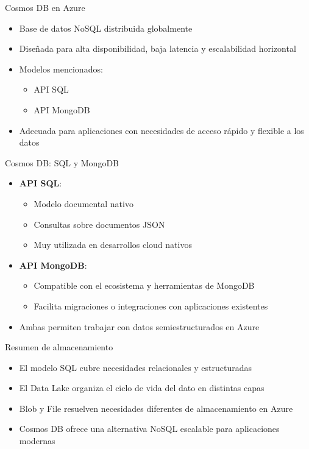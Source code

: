 \documentclass{beamer}
\begin{document}
\begin{frame}{Cosmos DB en Azure}
\begin{itemize}
    \item Base de datos NoSQL distribuida globalmente
    \item Diseñada para alta disponibilidad, baja latencia y escalabilidad horizontal
    \item Modelos mencionados:
    \begin{itemize}
        \item API SQL
        \item API MongoDB
    \end{itemize}
    \item Adecuada para aplicaciones con necesidades de acceso rápido y flexible a los datos
\end{itemize}
\end{frame}

\begin{frame}{Cosmos DB: SQL y MongoDB}
\begin{itemize}
    \item \textbf{API SQL}:
    \begin{itemize}
        \item Modelo documental nativo
        \item Consultas sobre documentos JSON
        \item Muy utilizada en desarrollos cloud nativos
    \end{itemize}
    \item \textbf{API MongoDB}:
    \begin{itemize}
        \item Compatible con el ecosistema y herramientas de MongoDB
        \item Facilita migraciones o integraciones con aplicaciones existentes
    \end{itemize}
    \item Ambas permiten trabajar con datos semiestructurados en Azure
\end{itemize}
\end{frame}

\begin{frame}{Resumen de almacenamiento}
\begin{itemize}
    \item El modelo SQL cubre necesidades relacionales y estructuradas
    \item El Data Lake organiza el ciclo de vida del dato en distintas capas
    \item Blob y File resuelven necesidades diferentes de almacenamiento en Azure
    \item Cosmos DB ofrece una alternativa NoSQL escalable para aplicaciones modernas
\end{itemize}
\end{frame}
\end{document}
